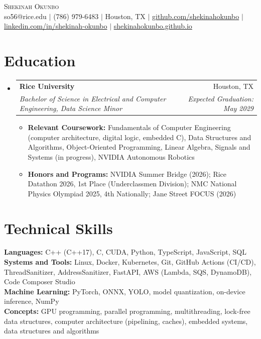 \documentclass[letterpaper,10pt]{article}
\makeatletter
\newcommand{\resumeItem}[1]{\item\small{#1 \vspace{-1pt}}}
\newcommand{\resumeSubheading}[4]{
  \vspace{-1pt}\item
    \begin{tabular*}{0.98\textwidth}[t]{l@{\extracolsep{\fill}}r}
      \textbf{#1} & #2 \\
      \textit{\small#3} & \textit{\small #4} \\
    \end{tabular*}\vspace{-4pt}
}
\newcommand{\resumeSubHeadingListStart}{\begin{itemize}[leftmargin=0.12in, label={}]}
\newcommand{\resumeSubHeadingListEnd}{\end{itemize}}
\newcommand{\resumeItemListStart}{\begin{itemize}[label=$\bullet$,leftmargin=0.2in,topsep=1pt,itemsep=1pt,parsep=0pt]}
\newcommand{\resumeItemListEnd}{\end{itemize}\vspace{-3pt}}
\makeatother
\begin{document}
\begin{center}
    {\Huge \scshape Shekinah Okunbo} \\ \vspace{2pt}
    \small so56@rice.edu $|$ (786) 979-6483 $|$ Houston, TX $|$
    \href{https://github.com/shekinahokunbo}{github.com/shekinahokunbo} $|$
    \href{https://linkedin.com/in/shekinah-okunbo}{linkedin.com/in/shekinah-okunbo} $|$
    \href{https://shekinahokunbo.github.io}{shekinahokunbo.github.io}
\end{center}

\section{Education}
  \resumeSubHeadingListStart
    \resumeSubheading
      {Rice University}{Houston, TX}
      {Bachelor of Science in Electrical and Computer Engineering, Data Science Minor}{Expected Graduation: May 2029}
      \resumeItemListStart
        \resumeItem{\textbf{Relevant Coursework:} Fundamentals of Computer Engineering (computer architecture, digital logic, embedded C), Data Structures and Algorithms, Object-Oriented Programming, Linear Algebra, Signals and Systems (in progress), NVIDIA Autonomous Robotics}
        \resumeItem{\textbf{Honors and Programs:} NVIDIA Summer Bridge (2026); Rice Datathon 2026, 1st Place (Underclassmen Division); NMC National Physics Olympiad 2025, 4th Nationally; Jane Street FOCUS (2026)}
      \resumeItemListEnd
  \resumeSubHeadingListEnd

\section{Technical Skills}
 \begin{itemize}[leftmargin=0.12in, label={}]
    \small{\item{
     \textbf{Languages:} C++ (C++17), C, CUDA, Python, TypeScript, JavaScript, SQL \\
     \textbf{Systems and Tools:} Linux, Docker, Kubernetes, Git, GitHub Actions (CI/CD), ThreadSanitizer, AddressSanitizer, FastAPI, AWS (Lambda, SQS, DynamoDB), Code Composer Studio \\
     \textbf{Machine Learning:} PyTorch, ONNX, YOLO, model quantization, on-device inference, NumPy \\
     \textbf{Concepts:} GPU programming, parallel programming, multithreading, lock-free data structures, computer architecture (pipelining, caches), embedded systems, data structures and algorithms
    }}
 \end{itemize}
\end{document}
